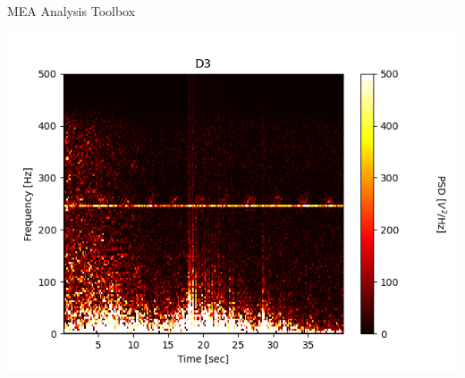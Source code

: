 \documentclass[10pt]{beamer}
\begin{document}
\begin{frame}[allowframebreaks]{MEA Analysis Toolbox}
\begin{center}
      \end{center}
      \framebreak
      \begin{center}
        \includegraphics[keepaspectratio,width=0.8\framewidth]{img/4_spectrogram.png}
      \end{center}
      \framebreak
      

\end{frame}
\end{document}
